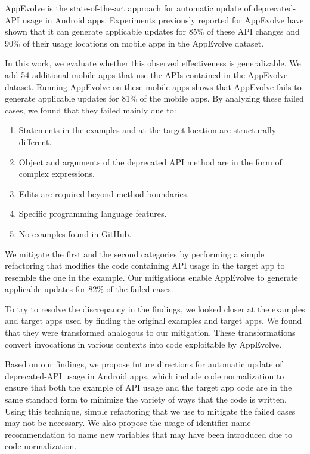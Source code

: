 AppEvolve is the state-of-the-art approach for automatic update of
deprecated-API usage in Android apps. Experiments previously reported for
AppEvolve have shown that it can generate applicable updates for
85\% of these API
changes and 90\% of their usage locations on mobile apps in the
AppEvolve dataset.

In this work, we evaluate whether this observed effectiveness is
generalizable. We add 54 additional mobile apps that use the APIs contained
in the AppEvolve dataset. Running AppEvolve on these mobile apps shows that
AppEvolve fails to generate applicable updates for 81\% of the mobile
apps. By analyzing these failed cases, we found that they failed mainly
due to:
\begin{enumerate}
    \item Statements in the examples and at the target location are structurally different.
    \item Object and arguments of the deprecated API method are in the form of complex expressions.
    \item Edits are required beyond method boundaries.
    \item Specific programming language features.
    \item No examples found in GitHub.
\end{enumerate}
We mitigate the first and the second categories by performing a simple
refactoring that modifies the code containing API usage in the target app
to resemble the one in the example. Our mitigations enable AppEvolve
to generate applicable updates for 82\% of the failed cases.

To try to resolve the discrepancy in the findings, we looked closer at the
examples and target apps used by finding the original examples and target
apps. We found that they were transformed analogous to our mitigation.
These transformations convert invocations in various contexts into code
exploitable by AppEvolve.

Based on our findings, we propose future directions for automatic update of
deprecated-API usage in Android apps, which include code normalization to
ensure that both the example of API usage and the target app code are in
the same standard form to minimize the variety of ways that the code is
written. Using this technique, simple refactoring that we use to mitigate
the failed cases may not be necessary. We also propose the usage of
identifier name recommendation to name new variables that may have been
introduced due to code normalization.
